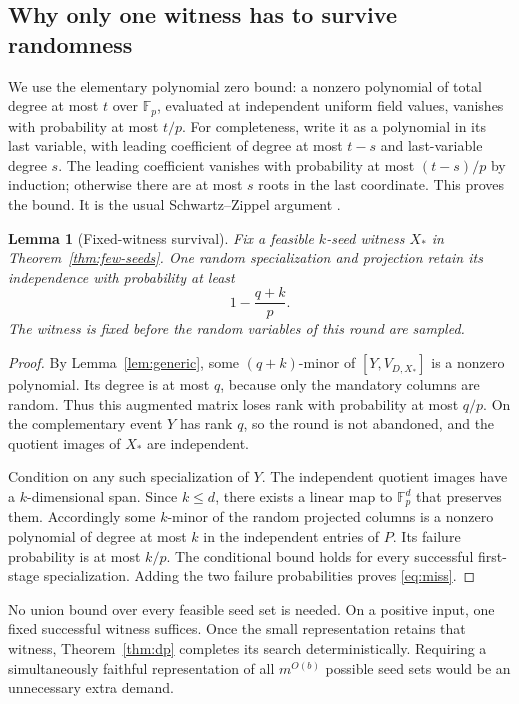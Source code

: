 \documentclass[11pt,letterpaper]{article}
\newtheorem{lemma}[theorem]{Lemma}
\theoremstyle{definition}
\newcommand{\F}{\mathbb F}
\begin{document}
\subsection{Why only one witness has to survive randomness}
We use the elementary polynomial zero bound: a nonzero polynomial of total
degree at most $t$ over $\F_p$, evaluated at independent uniform field
values, vanishes with probability at most $t/p$. For completeness, write it
as a polynomial in its last variable, with leading coefficient of degree
at most $t-s$ and last-variable degree $s$. The leading coefficient vanishes
with probability at most $(t-s)/p$ by induction; otherwise there are at most
$s$ roots in the last coordinate. This proves the bound. It is the usual
Schwartz--Zippel argument \cite{schwartz}.

\begin{lemma}[Fixed-witness survival]\label{lem:survival}
Fix a feasible $k$-seed witness $X_*$ in
Theorem~\ref{thm:few-seeds}. One random specialization and projection retain
its independence with probability at least
\begin{equation}\label{eq:miss}
 1-\frac{q+k}{p}.
\end{equation}
The witness is fixed before the random variables of this round are sampled.
\end{lemma}
\begin{proof}
By Lemma~\ref{lem:generic}, some $(q+k)$-minor of
$[Y,V_{D,X_*}]$ is a nonzero polynomial. Its degree is at most $q$, because
only the mandatory columns are random. Thus this augmented matrix loses
rank with probability at most $q/p$. On the complementary event $Y$ has
rank $q$, so the round is not abandoned, and the quotient images of $X_*$
are independent.

Condition on any such specialization of $Y$. The independent quotient
images have a $k$-dimensional span. Since $k\leq d$, there exists a linear
map to $\F_p^d$ that preserves them. Accordingly some $k$-minor of the
random projected columns is a nonzero polynomial of degree at most $k$ in
the independent entries of $P$. Its failure probability is at most $k/p$.
The conditional bound holds for every successful first-stage specialization.
Adding the two failure probabilities proves \eqref{eq:miss}.
\end{proof}

No union bound over every feasible seed set is needed. On a positive input,
one fixed successful witness suffices. Once the small representation retains
that witness, Theorem~\ref{thm:dp} completes its search deterministically.
Requiring a simultaneously faithful representation of all $m^{O(b)}$
possible seed sets would be an unnecessary extra demand.
\end{document}
